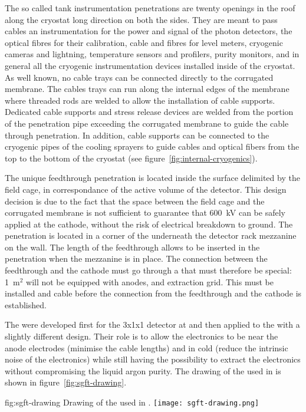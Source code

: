 The so called tank instrumentation penetrations are twenty openings in the roof along the cryostat long direction on both the sides.
They are meant to pass cables an instrumentation for the power and signal of the photon detectors, the optical fibres for their calibration, cable and fibres for level meters, cryogenic cameras and lightning, temperature sensors and profilers, purity monitors, and in general all the cryogenic instrumentation devices installed inside of the cryostat.
As well known, no cable trays can be connected directly to the corrugated membrane.
The cables trays can run along the internal edges of the membrane where threaded rods are welded to allow the installation of cable supports.
Dedicated cable supports and stress release devices are welded from the portion of the penetration pipe exceeding the corrugated membrane to guide the cable through penetration.
In addition, cable supports can be connected to the cryogenic pipes of the cooling sprayers to guide cables and optical fibers from the top to the bottom of the cryostat (see figure~\ref{fig:internal-cryogenics}).

The unique  feedthrough penetration is located inside the surface delimited by the field cage, in correspondance of the active volume of the detector.
This design decision is due to the fact that the space between the field cage and the corrugated membrane is not sufficient to guarantee that 600~kV can be safely applied at the cathode, without the risk of electrical breakdown to ground.
The penetration is located in a corner of the  underneath the detector rack mezzanine on the  wall.
The length of the feedthrough allows to be inserted in the penetration when the mezzanine is in place.
The connection between the feedthrough and the cathode must go through a  that must therefore be special: 1~m$^2$ will not be equipped with anodes,  and extraction grid.
This  must be installed and cable before the connection from the  feedthrough and the cathode is established.

The  were developed first for the 3x1x1 detector at  and then applied to the  with a slightly different design.
Their role is to allow the electronics to be near the anode electrodes (minimise the cable lengths) and in cold (reduce the intrinsic noise of the electronics) while still having the possibility to extract the electronics without compromising the liquid argon purity.
The drawing of the  used in  is shown in figure~\ref{fig:sgft-drawing}.
\begin{dunefigure}{fig:sgft-drawing}
{Drawing of the  used in .}
\texttt{[image: sgft-drawing.png]}
\end{dunefigure}

